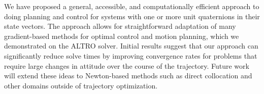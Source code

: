 \documentclass[letterpaper, 10 pt, conference]{ieeeconf}  %
\begin{document}
    We have proposed a general, accessible, and computationally efficient approach to
    doing planning and control for systems with one or more unit quaternions in their
    state vectors. The approach allows for straightforward adaptation of many
    gradient-based methods for optimal control and motion planning, which we demonstrated
    on the ALTRO solver. 
    Initial results suggest that our approach can significantly reduce solve times by 
    improving convergence rates for problems that require large changes in attitude over
    the course of the trajectory. Future work will extend these ideas to Newton-based methods
    such as direct collocation and other domains outside of trajectory optimization. 

        

\printbibliography
\end{document}
